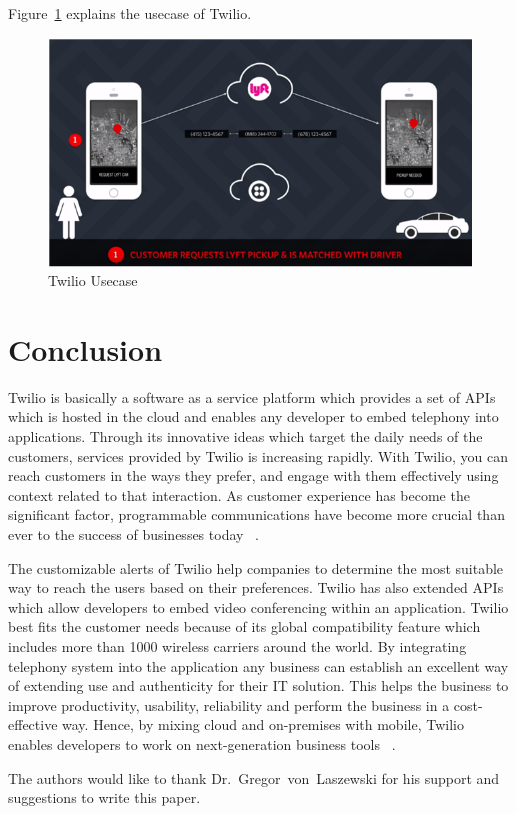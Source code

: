 Figure~\ref{f:usecase} explains the usecase of Twilio.


\begin{figure}[!ht]
  \centering\includegraphics[width=\columnwidth]{images/Twilio-Usecase.png}
  \caption{Twilio Usecase~\cite{hid-sp18-406-twilio-usecase-image}}
\label{f:usecase}
\end{figure}



\section{Conclusion}
Twilio is basically a software as a service platform which provides a set of 
APIs which is hosted in the cloud and enables any developer to embed telephony 
into applications. Through its innovative ideas which target the daily needs of 
the customers, services provided by Twilio is increasing rapidly. With Twilio, 
you can reach customers in the ways they prefer, and engage with them 
effectively using context related to that interaction. As customer experience 
has become the significant factor, programmable communications have become more 
crucial than ever to the success of businesses today
~\cite{hid-sp18-406-twilio-conclusion1}. 
 
The customizable alerts of Twilio help companies to determine the most suitable 
way to reach the users based on their preferences. Twilio has also extended APIs 
which allow developers to embed video conferencing within an application. Twilio
best fits the customer needs because of its global compatibility feature which 
includes more than 1000 wireless carriers around the world. By integrating  
telephony system into the application any business can establish an excellent 
way of extending use and authenticity for their IT solution. This helps the 
business to improve productivity, usability, reliability and perform the 
business in a cost-effective way. Hence, by mixing cloud and on-premises with 
mobile, Twilio enables developers to work on next-generation business tools
~\cite{hid-sp18-406-twilio-conclusion2}.

\begin{acks}

  The authors would like to thank Dr.~Gregor~von~Laszewski for his
  support and suggestions to write this paper.

\end{acks}


 


